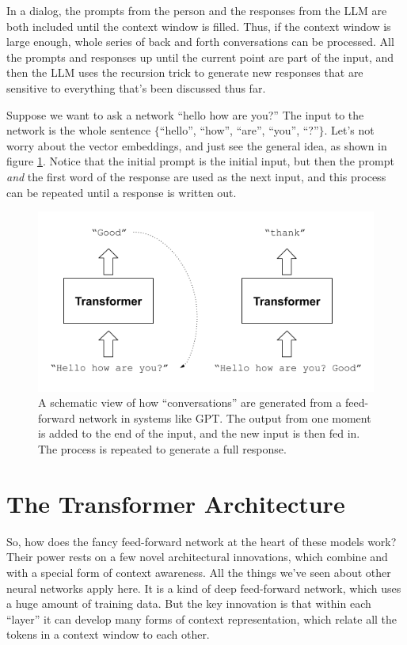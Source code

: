 In a dialog, the prompts from the person and the responses from the LLM are both included until the context window is filled. Thus, if the context window is large enough, whole series of back and forth conversations can be processed.  All the prompts and responses up until the current point are part of the input, and then the LLM uses the recursion trick to generate new responses that are sensitive to everything that's been discussed thus far.

Suppose we want to ask a network ``hello how are you?'' The input to the network is the whole sentence $\{$``hello'', ``how'', ``are'', ``you'', ``?''$\}$. Let's  not worry about the vector embeddings, and just see the general idea, as shown in figure \ref{gptRecursedInputs}. Notice that the initial prompt is the initial input, but then the prompt \emph{and} the first word of the response are used as the next input, and this process can be repeated until a response is written out.
  
\begin{figure}[h]
\centering
\includegraphics[scale=.7]{./images/gptRecursedInputs.png}
\caption[Jeff Yoshimi]{A schematic view of how ``conversations'' are generated from a feed-forward network in systems like GPT. The output from one moment is added to the end of the input, and the new input is then fed in. The process is repeated to generate a full response.}
\label{gptRecursedInputs}
\end{figure}

\section{The Transformer Architecture}\label{transformers}

So, how does the fancy feed-forward network at the heart of these models work? Their power rests on a few novel architectural innovations, which combine  and  with a special form of context awareness. All the things we've seen about other neural networks apply here. It is a kind of deep feed-forward network, which uses a huge amount of training data. But the key innovation is that within each ``layer'' it can develop many forms of context representation, which relate all the tokens in a context window to each other.

